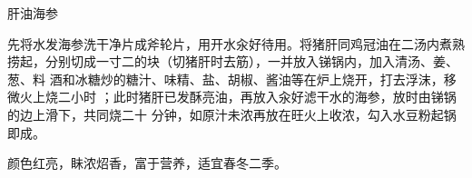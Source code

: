 \begin{recipe}{肝油海参}

\ingredients


\cooking

\step 先将水发海参洗干净片成斧轮片，用开水汆好待用。将猪肝同鸡冠油在二汤内煮熟
捞起，分别切成一寸二的块（切猪肝时去筋），一并放入锑锅内，加入清汤、姜、葱、料
酒和冰糖炒的糖汁、味精、盐、胡椒、酱油等在炉上烧开，打去浮沫，移微火上烧二小时
；此时猪肝已发酥亮油，再放入汆好滤干水的海参，放时由锑锅的边上滑下，共同烧二十
分钟，如原汁未浓再放在旺火上收浓，勾入水豆粉起锅即成。

\features

颜色红亮，眛浓炤香，富于营养，适宜春冬二季。

\end{recipe}

